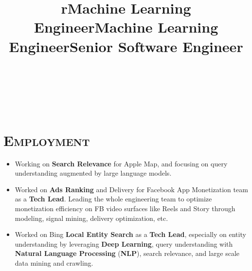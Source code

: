 \begin{resume}

\begin{formatb}
  \title{r}\\
  \\
  \body\\
\end{formatb}

\vspace*{-16pt}
\section{\textsc{Employment}}

\title{Machine Learning Engineer}
\begin{position}
\vspace*{-8pt}
\begin{itemize}
\item Working on \textbf{Search Relevance} for Apple Map, and focusing on query understanding augmented by large language models.
\end{itemize} 
\end{position}

\title{Machine Learning Engineer}
\begin{position}
\vspace*{-8pt}
\begin{itemize}
\item Worked on \textbf{Ads Ranking} and Delivery for Facebook App Monetization team as a \textbf{Tech Lead}. Leading the whole engineering team to optimize monetization efficiency on FB video surfaces like Reels and Story through modeling, signal mining, delivery optimization, etc.
\end{itemize} 
\end{position}

\title{Senior Software Engineer}
\begin{position}
\vspace*{-8pt}
\begin{itemize}
\item Worked on Bing \textbf{Local Entity Search} as a \textbf{Tech Lead}, especially on entity understanding by leveraging \textbf{Deep Learning}, query understanding with \textbf{Natural Language Processing} (\textbf{NLP}), search relevance, and large scale data mining and crawling.
\end{itemize} 
\end{position}


\end{resume}
